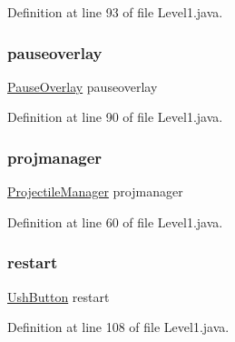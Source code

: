 Definition at line 93 of file Level1.\+java.

\mbox{\label{classscenes_1_1_level1_a544fb9294d892e35b4b0316e07997cd6}} 
\subsubsection{\texorpdfstring{pauseoverlay}{pauseoverlay}}
{\footnotesize\ttfamily \hyperlink{classui_1_1_pause_overlay}{Pause\+Overlay} pauseoverlay\hspace{0.3cm}{\ttfamily [private]}}



Definition at line 90 of file Level1.\+java.

\mbox{\label{classscenes_1_1_level1_aee34cf906685787259a2edd7d4559863}} 
\subsubsection{\texorpdfstring{projmanager}{projmanager}}
{\footnotesize\ttfamily \hyperlink{classmanagers_1_1_projectile_manager}{Projectile\+Manager} projmanager\hspace{0.3cm}{\ttfamily [private]}}



Definition at line 60 of file Level1.\+java.

\mbox{\label{classscenes_1_1_level1_ac1d34384911014e49613ccfb1abddbcc}} 
\subsubsection{\texorpdfstring{restart}{restart}}
{\footnotesize\ttfamily \hyperlink{classui_1_1_ush_button}{Ush\+Button} restart\hspace{0.3cm}{\ttfamily [private]}}



Definition at line 108 of file Level1.\+java.

